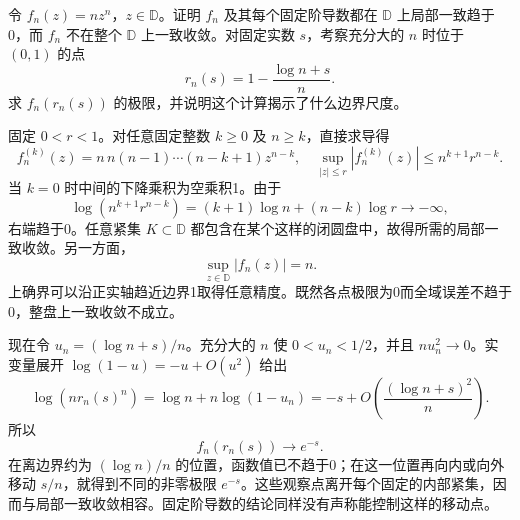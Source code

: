 \begin{exercise}\label{b3:ex:04-1}
令 \(f_n(z)=nz^n\)，\(z\in\mathbb D\)。证明 \(f_n\) 及其每个固定阶导数都在 \(\mathbb D\) 上局部一致趋于0，而 \(f_n\) 不在整个 \(\mathbb D\) 上一致收敛。对固定实数 \(s\)，考察充分大的 \(n\) 时位于 \((0,1)\) 的点
\[
 r_n(s)=1-\frac{\log n+s}{n}.
\]
求 \(f_n(r_n(s))\) 的极限，并说明这个计算揭示了什么边界尺度。
\end{exercise}
\begin{solution}
固定 \(0<r<1\)。对任意固定整数 \(k\ge0\) 及 \(n\ge k\)，直接求导得
\[
 f_n^{(k)}(z)
 =n\,n(n-1)\cdots(n-k+1)z^{n-k},
 \quad
 \sup_{|z|\le r}|f_n^{(k)}(z)|
 \le n^{k+1}r^{n-k}.
\]
当 \(k=0\) 时中间的下降乘积为空乘积1。由于
\[
 \log\left(n^{k+1}r^{n-k}\right)
 =(k+1)\log n+(n-k)\log r\longrightarrow-\infty,
\]
右端趋于0。任意紧集 \(K\subset\mathbb D\) 都包含在某个这样的闭圆盘中，故得所需的局部一致收敛。另一方面，
\[
 \sup_{z\in\mathbb D}|f_n(z)|=n.
\]
上确界可以沿正实轴趋近边界1取得任意精度。既然各点极限为0而全域误差不趋于0，整盘上一致收敛不成立。

现在令 \(u_n=(\log n+s)/n\)。充分大的 \(n\) 使 \(0<u_n<1/2\)，并且 \(nu_n^2\to0\)。实变量展开
\(\log(1-u)=-u+O(u^2)\) 给出
\[
 \log\left(nr_n(s)^n\right)
 =\log n+n\log(1-u_n)
 =-s+O\left(\frac{(\log n+s)^2}{n}\right).
\]
所以
\[
 f_n(r_n(s))\longrightarrow e^{-s}.
\]
在离边界约为 \((\log n)/n\) 的位置，函数值已不趋于0；在这一位置再向内或向外移动 \(s/n\)，就得到不同的非零极限 \(e^{-s}\)。这些观察点离开每个固定的内部紧集，因而与局部一致收敛相容。固定阶导数的结论同样没有声称能控制这样的移动点。
\end{solution}

